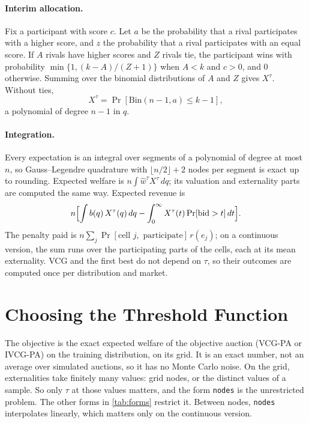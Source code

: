 \documentclass[11pt]{article}
\newcommand{\code}[1]{\texttt{#1}}
\begin{document}
\paragraph{Interim allocation.} Fix a participant with score $c$. Let $a$ be the probability that a rival participates with a higher score, and $z$ the probability that a rival participates with an equal score. If $A$ rivals have higher scores and $Z$ rivals tie, the participant wins with probability $\min\{1,(k-A)/(Z+1)\}$ when $A<k$ and $c>0$, and $0$ otherwise. Summing over the binomial distributions of $A$ and $Z$ gives $X^\tau$. Without ties,
\[
X^\tau=\Pr[\mathrm{Bin}(n-1,a)\leq k-1],
\]
a polynomial of degree $n-1$ in $q$.

\paragraph{Integration.} Every expectation is an integral over segments of a polynomial of degree at most $n$, so Gauss--Legendre quadrature with $\lfloor n/2\rfloor+2$ nodes per segment is exact up to rounding. Expected welfare is $n\int\hat w^\tau X^\tau\,dq$; its valuation and externality parts are computed the same way. Expected revenue is
\[
n\Bigl[\int b(q)\,X^\tau(q)\,dq-\int_0^\infty X^\tau(t)\Pr[\text{bid}>t]\,dt\Bigr].
\]
The penalty paid is $n\sum_j\Pr[\text{cell }j,\text{ participate}]\,r(e_j)$; on a continuous version, the sum runs over the participating parts of the cells, each at its mean externality. VCG and the first best do not depend on $\tau$, so their outcomes are computed once per distribution and market.

\section{Choosing the Threshold Function}\label{sec:optimization}

The objective is the exact expected welfare of the objective auction (VCG-PA or IVCG-PA) on the training distribution, on its grid. It is an exact number, not an average over simulated auctions, so it has no Monte Carlo noise. On the grid, externalities take finitely many values: grid nodes, or the distinct values of a sample. So only $\tau$ at those values matters, and the form \code{nodes} is the unrestricted problem. The other forms in \cref{tab:forms} restrict it. Between nodes, \code{nodes} interpolates linearly, which matters only on the continuous version.
\end{document}
